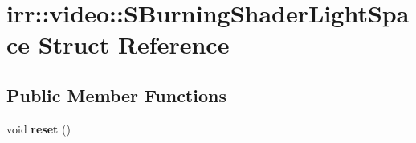 \hypertarget{structirr_1_1video_1_1_s_burning_shader_light_space}{\section{irr\-:\-:video\-:\-:S\-Burning\-Shader\-Light\-Space Struct Reference}
\label{structirr_1_1video_1_1_s_burning_shader_light_space}
}
\subsection*{Public Member Functions}
\begin{DoxyCompactItemize}
\item 
\hypertarget{structirr_1_1video_1_1_s_burning_shader_light_space_aea5542f97e7da1531e28f1791e624f62}{void {\bfseries reset} ()}\label{structirr_1_1video_1_1_s_burning_shader_light_space_aea5542f97e7da1531e28f1791e624f62}

\end{DoxyCompactItemize}
